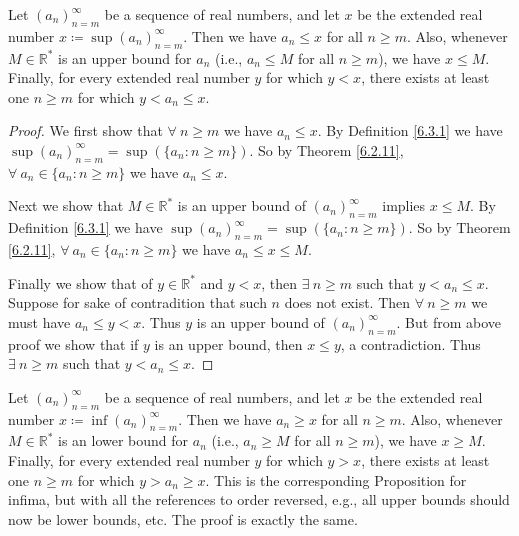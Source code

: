 \setcounter{theorem}{5}
\begin{proposition}\label{6.3.6}
Let \((a_n)_{n = m}^\infty\) be a sequence of real numbers, and let \(x\) be the extended real number \(x \coloneqq \sup(a_n)_{n = m}^\infty\).
Then we have \(a_n \leq x\) for all \(n \geq m\).
Also, whenever \(M \in \mathds{R}^*\) is an upper bound for \(a_n\) (i.e., \(a_n \leq M\) for all \(n \geq m\)), we have \(x \leq M\).
Finally, for every extended real number \(y\) for which \(y < x\), there exists at least one \(n \geq m\) for which \(y < a_n \leq x\).
\end{proposition}

\begin{proof}
We first show that \(\forall\ n \geq m\) we have \(a_n \leq x\).
By Definition \ref{6.3.1} we have \(\sup(a_n)_{n = m}^\infty = \sup(\{a_n : n \geq m\})\).
So by Theorem \ref{6.2.11}, \(\forall\ a_n \in \{a_n : n \geq m\}\) we have \(a_n \leq x\).

Next we show that \(M \in \mathds{R}^*\) is an upper bound of \((a_n)_{n = m}^\infty\) implies \(x \leq M\).
By Definition \ref{6.3.1} we have \(\sup(a_n)_{n = m}^\infty = \sup(\{a_n : n \geq m\})\).
So by Theorem \ref{6.2.11}, \(\forall\ a_n \in \{a_n : n \geq m\}\) we have \(a_n \leq x \leq M\).

Finally we show that of \(y \in \mathds{R}^*\) and \(y < x\), then \(\exists\ n \geq m\) such that \(y < a_n \leq x\).
Suppose for sake of contradition that such \(n\) does not exist.
Then \(\forall\ n \geq m\) we must have \(a_n \leq y < x\).
Thus \(y\) is an upper bound of \((a_n)_{n = m}^\infty\).
But from above proof we show that if \(y\) is an upper bound, then \(x \leq y\), a contradiction.
Thus \(\exists\ n \geq m\) such that \(y < a_n \leq x\).
\end{proof}

\begin{remark}\label{6.3.7}
Let \((a_n)_{n = m}^\infty\) be a sequence of real numbers, and let \(x\) be the extended real number \(x \coloneqq \inf(a_n)_{n = m}^\infty\).
Then we have \(a_n \geq x\) for all \(n \geq m\).
Also, whenever \(M \in \mathds{R}^*\) is an lower bound for \(a_n\) (i.e., \(a_n \geq M\) for all \(n \geq m\)), we have \(x \geq M\).
Finally, for every extended real number \(y\) for which \(y > x\), there exists at least one \(n \geq m\) for which \(y > a_n \geq x\).
This is the corresponding Proposition for infima, but with all the references to order reversed, e.g., all upper bounds should now be lower bounds, etc.
The proof is exactly the same.
\end{remark}

